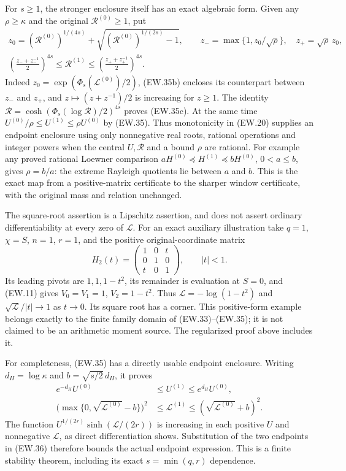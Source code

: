 For $s\ge1$, the stronger enclosure itself has an exact algebraic form.
Given any $\rho\ge\kappa$ and the original $\mathscr R^{(0)}\ge1$,
put
\[
 \begin{gathered}
 z_0=(\mathscr R^{(0)})^{1/(4s)}
       +\sqrt{(\mathscr R^{(0)})^{1/(2s)}-1},\qquad
 z_-=\max\{1,z_0/\sqrt\rho\},\quad z_+=\sqrt\rho\,z_0,\\
 \boxed{\left(\frac{z_-+z_-^{-1}}2\right)^{4s}
       \le\mathscr R^{(1)}\le
       \left(\frac{z_++z_+^{-1}}2\right)^{4s}.}
 \end{gathered}                                               \tag{EW.35c}
\]
Indeed $z_0=\exp(\Phi_s(\mathscr L^{(0)})/2)$,
(EW.35b) encloses its counterpart between $z_-$ and $z_+$,
and $z\mapsto(z+z^{-1})/2$ is increasing for $z\ge1$.
The identity $\mathscr R=\cosh(\Phi_s(\log\mathscr R)/2)^{4s}$
proves (EW.35c). At the same time
$U^{(0)}/\rho\le U^{(1)}\le\rho U^{(0)}$ by (EW.35).
Thus monotonicity in (EW.20) supplies an endpoint enclosure using
only nonnegative real roots, rational operations and integer powers when
the central $U,\mathscr R$ and a bound $\rho$ are rational.
For example any proved rational Loewner comparison
$aH^{(0)}\preceq H^{(1)}\preceq bH^{(0)}$, $0<a\le b$,
gives $\rho=b/a$: the extreme Rayleigh quotients lie between
$a$ and $b$. This is the exact map from a positive-matrix
certificate to the sharper window certificate, with the original
mass and relation unchanged.

The square-root assertion is a Lipschitz assertion, and does not
assert ordinary differentiability at every zero of $\mathscr L$.
For an exact auxiliary illustration take $q=1$, $\chi=S$, $n=1$,
$r=1$, and the positive original-coordinate matrix
\[
 H_2(t)=\begin{pmatrix}1&0&t\\0&1&0\\t&0&1\end{pmatrix},
 \qquad |t|<1.
\]
Its leading pivots are $1,1,1-t^2$, its remainder is evaluation
at $S=0$, and (EW.11) gives $V_0=V_1=1$, $V_2=1-t^2$.
Thus $\mathscr L=-\log(1-t^2)$ and
$\sqrt{\mathscr L}/|t|\to1$ as $t\to0$. Its square root
has a corner. This positive-form example belongs exactly to the
finite family domain of (EW.33)--(EW.35); it is not claimed to be
an arithmetic moment source. The regularized proof above includes it.

For completeness, (EW.35) has a directly usable endpoint enclosure.
Writing $d_H=\log\kappa$ and
$b=\sqrt{s/2}\,d_H$, it proves
\[
 \begin{split}
 e^{-d_H}U^{(0)}&\le U^{(1)}\le e^{d_H}U^{(0)},\\
 \bigl(\max\{0,\sqrt{\mathscr L^{(0)}}-b\}\bigr)^2
 &\le\mathscr L^{(1)}
 \le(\sqrt{\mathscr L^{(0)}}+b)^2.
 \end{split}                                                   \tag{EW.36}
\]
The function $U^{1/(2r)}\sinh(\mathscr L/(2r))$ is increasing
in each positive $U$ and nonnegative $\mathscr L$, as direct
differentiation shows. Substitution of the two endpoints in (EW.36)
therefore bounds the actual endpoint expression. This is a finite
stability theorem, including its exact $s=\min(q,r)$ dependence.

